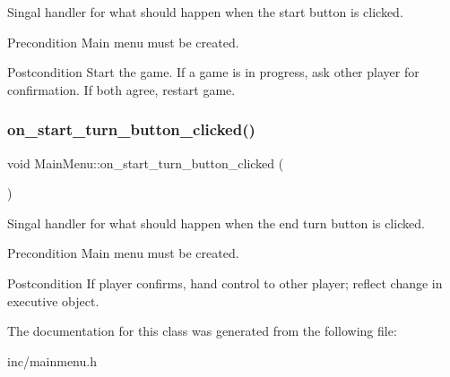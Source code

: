 Singal handler for what should happen when the start button is clicked. 

\begin{DoxyPrecond}{Precondition}
Main menu must be created. 
\end{DoxyPrecond}
\begin{DoxyPostcond}{Postcondition}
Start the game. If a game is in progress, ask other player for confirmation. If both agree, restart game. 
\end{DoxyPostcond}
\mbox{\label{classMainMenu_a2d91523fbe9c753f1de2ff429178b0d2}} 
\subsubsection{\texorpdfstring{on\_start\_turn\_button\_clicked()}{on\_start\_turn\_button\_clicked()}}
{\footnotesize\ttfamily void Main\+Menu\+::on\+\_\+start\+\_\+turn\+\_\+button\+\_\+clicked (\begin{DoxyParamCaption}{ }\end{DoxyParamCaption})\hspace{0.3cm}{\ttfamily [protected]}}



Singal handler for what should happen when the end turn button is clicked. 

\begin{DoxyPrecond}{Precondition}
Main menu must be created. 
\end{DoxyPrecond}
\begin{DoxyPostcond}{Postcondition}
If player confirms, hand control to other player; reflect change in executive object. 
\end{DoxyPostcond}


The documentation for this class was generated from the following file\+:\begin{DoxyCompactItemize}
\item 
inc/mainmenu.\+h\end{DoxyCompactItemize}
